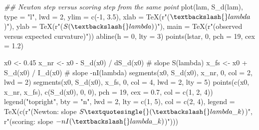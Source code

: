 \documentclass[
  letterpaper,
  DIV=11,
  numbers=noendperiod]{scrreprt}
\newenvironment{Shaded}{\begin{snugshade}}{\end{snugshade}}
\newcommand{\AttributeTok}[1]{\textcolor[rgb]{0.40,0.45,0.13}{#1}}
\newcommand{\CommentTok}[1]{\textcolor[rgb]{0.37,0.37,0.37}{#1}}
\newcommand{\DecValTok}[1]{\textcolor[rgb]{0.68,0.00,0.00}{#1}}
\newcommand{\DocumentationTok}[1]{\textcolor[rgb]{0.37,0.37,0.37}{\textit{#1}}}
\newcommand{\FloatTok}[1]{\textcolor[rgb]{0.68,0.00,0.00}{#1}}
\newcommand{\FunctionTok}[1]{\textcolor[rgb]{0.28,0.35,0.67}{#1}}
\newcommand{\NormalTok}[1]{\textcolor[rgb]{0.00,0.23,0.31}{#1}}
\newcommand{\OtherTok}[1]{\textcolor[rgb]{0.00,0.23,0.31}{#1}}
\newcommand{\SpecialCharTok}[1]{\textcolor[rgb]{0.37,0.37,0.37}{#1}}
\newcommand{\StringTok}[1]{\textcolor[rgb]{0.13,0.47,0.30}{#1}}
\begin{document}
\begin{Shaded}
\begin{Highlighting}[]
\DocumentationTok{\#\# Newton step versus scoring step from the same point}
\FunctionTok{plot}\NormalTok{(lam, }\FunctionTok{S\_d}\NormalTok{(lam), }\AttributeTok{type =} \StringTok{"l"}\NormalTok{, }\AttributeTok{lwd =} \DecValTok{2}\NormalTok{, }\AttributeTok{ylim =} \FunctionTok{c}\NormalTok{(}\SpecialCharTok{{-}}\DecValTok{1}\NormalTok{, }\FloatTok{3.5}\NormalTok{),}
     \AttributeTok{xlab =} \FunctionTok{TeX}\NormalTok{(r}\StringTok{"($\textbackslash{}lambda$)"}\NormalTok{), }\AttributeTok{ylab =} \FunctionTok{TeX}\NormalTok{(r}\StringTok{"($S(\textbackslash{}lambda)$)"}\NormalTok{),}
     \AttributeTok{main =} \FunctionTok{TeX}\NormalTok{(r}\StringTok{"(observed versus expected curvature)"}\NormalTok{))}
\FunctionTok{abline}\NormalTok{(}\AttributeTok{h =} \DecValTok{0}\NormalTok{, }\AttributeTok{lty =} \DecValTok{3}\NormalTok{)}
\FunctionTok{points}\NormalTok{(lstar, }\DecValTok{0}\NormalTok{, }\AttributeTok{pch =} \DecValTok{19}\NormalTok{, }\AttributeTok{cex =} \FloatTok{1.2}\NormalTok{)}

\NormalTok{x0 }\OtherTok{\textless{}{-}} \FloatTok{0.45}
\NormalTok{x\_nr }\OtherTok{\textless{}{-}}\NormalTok{ x0 }\SpecialCharTok{{-}} \FunctionTok{S\_d}\NormalTok{(x0) }\SpecialCharTok{/} \FunctionTok{dS\_d}\NormalTok{(x0)          }\CommentTok{\# slope  S\textquotesingle{}(lambda)}
\NormalTok{x\_fs }\OtherTok{\textless{}{-}}\NormalTok{ x0 }\SpecialCharTok{+} \FunctionTok{S\_d}\NormalTok{(x0) }\SpecialCharTok{/} \FunctionTok{I\_d}\NormalTok{(x0)           }\CommentTok{\# slope {-}nI(lambda)}
\FunctionTok{segments}\NormalTok{(x0, }\FunctionTok{S\_d}\NormalTok{(x0), x\_nr, }\DecValTok{0}\NormalTok{, }\AttributeTok{col =} \DecValTok{2}\NormalTok{, }\AttributeTok{lwd =} \DecValTok{2}\NormalTok{)}
\FunctionTok{segments}\NormalTok{(x0, }\FunctionTok{S\_d}\NormalTok{(x0), x\_fs, }\DecValTok{0}\NormalTok{, }\AttributeTok{col =} \DecValTok{4}\NormalTok{, }\AttributeTok{lwd =} \DecValTok{2}\NormalTok{, }\AttributeTok{lty =} \DecValTok{5}\NormalTok{)}
\FunctionTok{points}\NormalTok{(}\FunctionTok{c}\NormalTok{(x0, x\_nr, x\_fs), }\FunctionTok{c}\NormalTok{(}\FunctionTok{S\_d}\NormalTok{(x0), }\DecValTok{0}\NormalTok{, }\DecValTok{0}\NormalTok{), }\AttributeTok{pch =} \DecValTok{19}\NormalTok{, }\AttributeTok{cex =} \FloatTok{0.7}\NormalTok{, }\AttributeTok{col =} \FunctionTok{c}\NormalTok{(}\DecValTok{1}\NormalTok{, }\DecValTok{2}\NormalTok{, }\DecValTok{4}\NormalTok{))}
\FunctionTok{legend}\NormalTok{(}\StringTok{"topright"}\NormalTok{, }\AttributeTok{bty =} \StringTok{"n"}\NormalTok{, }\AttributeTok{lwd =} \DecValTok{2}\NormalTok{, }\AttributeTok{lty =} \FunctionTok{c}\NormalTok{(}\DecValTok{1}\NormalTok{, }\DecValTok{5}\NormalTok{), }\AttributeTok{col =} \FunctionTok{c}\NormalTok{(}\DecValTok{2}\NormalTok{, }\DecValTok{4}\NormalTok{),}
       \AttributeTok{legend =} \FunctionTok{TeX}\NormalTok{(}\FunctionTok{c}\NormalTok{(r}\StringTok{"(Newton: slope $S\textquotesingle{}(\textbackslash{}lambda\_k)$)"}\NormalTok{, r}\StringTok{"(scoring: slope ${-}nI(\textbackslash{}lambda\_k)$)"}\NormalTok{)))}
\end{Highlighting}
\end{Shaded}
\end{document}
